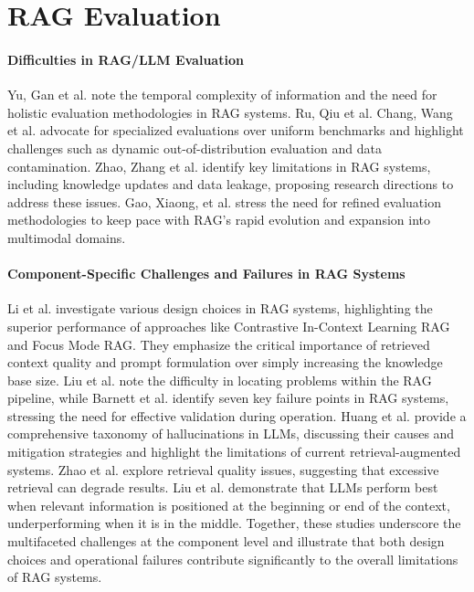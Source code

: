 \section{RAG Evaluation}

\paragraph{Difficulties in RAG/LLM Evaluation}
Yu, Gan et al.\cite{Yu.2024} note the temporal complexity of information and the need for holistic evaluation methodologies in RAG systems. Ru, Qiu et al. Chang, Wang et al.\cite{Chang.06.07.2023} advocate for specialized evaluations over uniform benchmarks and highlight challenges such as dynamic out-of-distribution evaluation and data contamination. Zhao, Zhang et al.\cite{Zhao.29.02.2024} identify key limitations in RAG systems, including knowledge updates and data leakage, proposing research directions to address these issues. Gao, Xiaong, et al.\cite{Gao.18.12.2023} stress the need for refined evaluation methodologies to keep pace with RAG's rapid evolution and expansion into multimodal domains. 

\paragraph{Component-Specific Challenges and Failures in RAG Systems}
Li et al.\cite{Li.13.01.2025} investigate various design choices in RAG systems, highlighting the superior performance of approaches like Contrastive In-Context Learning RAG and Focus Mode RAG. They emphasize the critical importance of retrieved context quality and prompt formulation over simply increasing the knowledge base size. Liu et al.\cite{JintaoLiu.2024} note the difficulty in locating problems within the RAG pipeline, while Barnett et al.\cite{Barnett.2024} identify seven key failure points in RAG systems, stressing the need for effective validation during operation. Huang et al.\cite{Huang.2023} provide a comprehensive taxonomy of hallucinations in LLMs, discussing their causes and mitigation strategies and highlight the limitations of current retrieval-augmented systems. Zhao et al.\cite{Zhao.29.02.2024} explore retrieval quality issues, suggesting that excessive retrieval can degrade results. Liu et al.\cite{Liu.06.07.2023} demonstrate that LLMs perform best when relevant information is positioned at the beginning or end of the context, underperforming when it is in the middle. Together, these studies underscore the multifaceted challenges at the component level and illustrate that both design choices and operational failures contribute significantly to the overall limitations of RAG systems.


